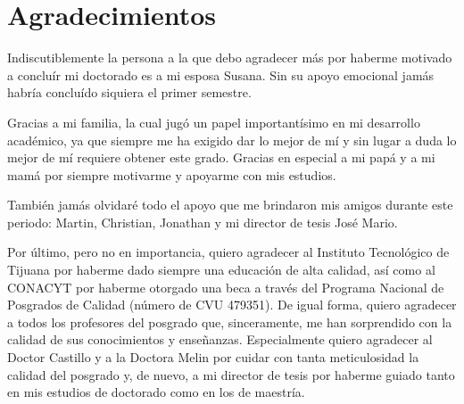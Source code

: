 \clearpage

\section*{Agradecimientos}

Indiscutiblemente la persona a la que debo agradecer más por haberme motivado a concluír mi doctorado es a mi esposa Susana. Sin su apoyo emocional jamás habría concluído siquiera el primer semestre.

Gracias a mi familia, la cual jugó un papel importantísimo en mi desarrollo académico, ya que siempre me ha exigido dar lo mejor de mí y sin lugar a duda lo mejor de mí requiere obtener este grado. Gracias en especial a mi papá y a mi mamá por siempre motivarme y apoyarme con mis estudios.

También jamás olvidaré todo el apoyo que me brindaron mis amigos durante este periodo: Martin, Christian, Jonathan y mi director de tesis José Mario.

Por último, pero no en importancia, quiero agradecer al Instituto Tecnológico de Tijuana por haberme dado siempre una educación de alta calidad, así como al CONACYT por haberme otorgado una beca a través del Programa Nacional de Posgrados de Calidad (número de CVU 479351). De igual forma, quiero agradecer a todos los profesores del posgrado que, sinceramente, me han sorprendido con la calidad de sus conocimientos y enseñanzas. Especialmente quiero agradecer al Doctor Castillo y a la Doctora Melin por cuidar con tanta meticulosidad la calidad del posgrado y, de nuevo, a mi director de tesis por haberme guiado tanto en mis estudios de doctorado como en los de maestría.

